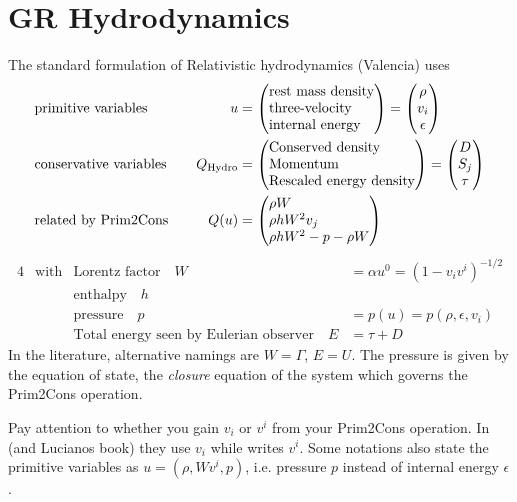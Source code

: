 \documentclass[a4paper]{article}
\newcommand{\desc}[1]{\text{#1}\quad}
\newcommand{\hydro}{\text{Hydro}}
\newenvironment{pvector}{\begin{pmatrix*}[l]}{\end{pmatrix*}}
\begin{document}
\section{GR Hydrodynamics}
The standard formulation of Relativistic hydrodynamics (Valencia)
uses
\begin{alignat}{4}
\label{eq.grhd.prim}
&\text{primitive variables}
&
\quad u &=
\begin{pvector}
\text{rest mass density} \\
\text{three-velocity} \\
\text{internal energy}
\end{pvector}
= \begin{pmatrix} \rho \\ v_i \\ \epsilon \end{pmatrix}
\\
\label{eq.grhd.cons}
&
\desc{conservative variables}
&
Q_\hydro
&=
\begin{pvector}
\text{Conserved density} \\
\text{Momentum} \\
\text{Rescaled energy density}
\end{pvector}
=
\begin{pmatrix} D \\ S_j \\ \tau \end{pmatrix}
\\
&
\desc{related by Prim2Cons}
&
Q(u)
&=
\begin{pvector}
\rho W \\
\rho h W^2 v_j \\
\rho h W^2 - p - \rho W
\end{pvector}
\label{eq.grhd.Qu}
\end{alignat}
\begin{alignat}{4}
&\text{with}
&
\desc{Lorentz factor}
W&=\alpha u^0 = (1 - v_i v^i)^{-1/2}
\\
&&
\desc{enthalpy} h &
\\
&&
\desc{pressure} p &= p(u) = p(\rho,\epsilon, v_i)
\\
&&
\desc{Total energy seen by Eulerian observer} E
&= \tau + D
\end{alignat}
In the literature, alternative namings are $W=\Gamma$, $E=U$.
The pressure is given by the equation of state, the \emph{closure}
equation of the system which governs the Prim2Cons operation.

Pay attention to whether you gain $v_i$ or $v^i$ from your Prim2Cons
operation. In \cite{THC} (and Lucianos book) they use $v_i$ while
\cite{BHAC} writes $v^i$. Some notations also state the primitive
variables as $u=(\rho,W v^i, p)$, i.e. pressure $p$ instead of
internal energy $\epsilon$.
\end{document}
